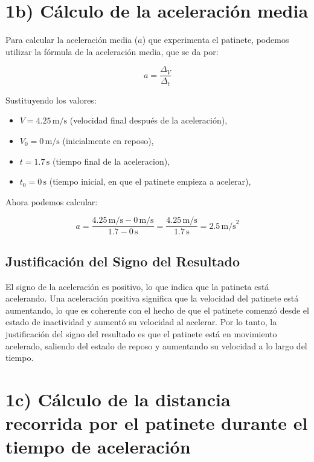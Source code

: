 \documentclass{article}
\begin{document}
\section*{1b) Cálculo de la aceleración media}

Para calcular la aceleración media (\(a\)) que experimenta el patinete, podemos utilizar la fórmula de la aceleración media, que se da por:

\[
a = \frac{\Delta_V}{\Delta_t}
\]

Sustituyendo los valores:

\begin{itemize}
    \item \(V = 4.25 \, \text{m/s}\) (velocidad final después de la aceleración),
    \item \(V_0 = 0 \, \text{m/s}\) (inicialmente en reposo),
    \item \(t = 1.7 \, \text{s}\) (tiempo final de la aceleracion),
    \item \(t_0 = 0 \, \text{s}\) (tiempo inicial, en que el patinete empieza a acelerar),

\end{itemize}

Ahora podemos calcular:

\[
a = \frac{4.25 \, \text{m/s} - 0 \, \text{m/s}}{1.7 - 0 \, \text{s}} = \frac{4.25 \, \text{m/s}}{1.7 \, \text{s}} = 2.5 \, \text{m/s}^2
\]

\subsection*{Justificación del Signo del Resultado}

El signo de la aceleración es positivo, lo que indica que la patineta está acelerando. Una aceleración positiva significa que la velocidad del patinete está aumentando, lo que es coherente con el hecho de que el patinete comenzó desde el estado de inactividad y aumentó su velocidad al acelerar. Por lo tanto, la justificación del signo del resultado es que el patinete está en movimiento acelerado, saliendo del estado de reposo y aumentando su velocidad a lo largo del tiempo.


\section*{1c) Cálculo de la distancia recorrida por el patinete durante el tiempo de aceleración}
\end{document}
